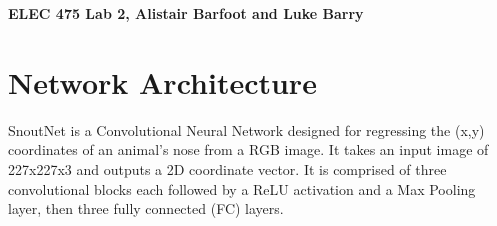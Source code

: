 \documentclass[letterpaper,11pt]{article}
\begin{document}
\begin{center}
  \LARGE
  \textbf{ELEC 475 Lab 2, Alistair Barfoot and Luke Barry}\\[12pt]
  \normalsize
\end{center}
\tableofcontents

\newpage

\section{Network Architecture}
SnoutNet is a Convolutional Neural Network designed for regressing the (x,y) coordinates of an animal's nose from a RGB image. It takes an input image of 227x227x3 and outputs a 2D coordinate vector. It is comprised of three convolutional blocks each followed by a ReLU activation and a Max Pooling layer, then three fully connected (FC) layers.
\end{document}
